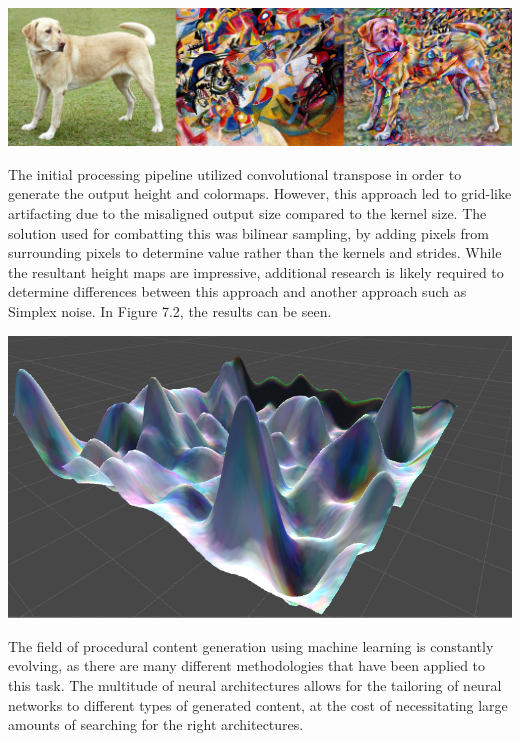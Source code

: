 \documentclass[10pt]{report}
\begin{document}
		\begin{minipage}{\textwidth}
			\centering
			\includegraphics[scale=.3]{stylized-image}
			\label{fig:fig7}
		\end{minipage}
	
		The initial processing pipeline utilized convolutional transpose in order to generate the output height and colormaps. However, this approach led to grid-like artifacting due to the misaligned output size compared to the kernel size. The solution used for combatting this was bilinear sampling, by adding pixels from surrounding pixels to determine value rather than the kernels and strides. While the resultant height maps are impressive, additional research is likely required to determine differences between this approach and another approach such as Simplex noise. In Figure 7.2, the results can be seen. 
		
		\begin{minipage}{\textwidth}
			\centering
			\includegraphics[scale=.3]{rolling}
			\label{fig:fig8}
		\end{minipage}
	
		The field of procedural content generation using machine learning is constantly evolving, as there are many different methodologies that have been applied to this task. The multitude of neural architectures allows for the tailoring of neural networks to different types of generated content, at the cost of necessitating large amounts of searching for the right architectures.
		
\end{document}
